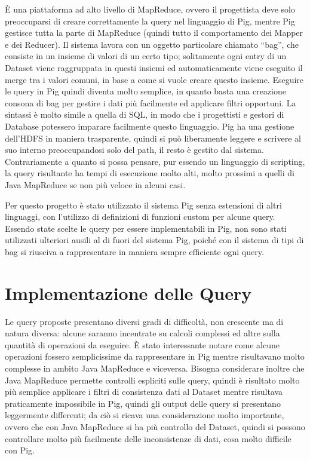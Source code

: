 \documentclass[11pt]{article} %
\begin{document}
 \`E una piattaforma ad alto livello di MapReduce, ovvero il progettista deve solo preoccuparsi di creare correttamente la query nel linguaggio di Pig, mentre Pig gestisce tutta la parte di MapReduce (quindi tutto il comportamento dei Mapper e dei Reducer). Il sistema lavora con un oggetto particolare chiamato ``bag'', che consiste in un insieme di valori di un certo tipo; solitamente ogni entry di un Dataset viene raggruppata in questi insiemi ed automaticamente viene eseguito il merge tra i valori comuni, in base a come si vuole creare questo insieme. Eseguire le query in Pig quindi diventa molto semplice, in quanto basta una creazione consona di bag per gestire i dati più facilmente ed applicare filtri opportuni.  La sintassi è molto simile a quella di SQL, in modo che i progettisti e gestori di Database potessero imparare facilmente questo linguaggio. Pig ha una gestione dell'HDFS in maniera trasparente, quindi si può liberamente leggere e scrivere al suo interno preoccupandosi solo del path, il resto è gestito dal sistema. Contrariamente a quanto si possa pensare, pur essendo un linguaggio di scripting, la query risultante ha tempi di esecuzione molto alti, molto prossimi a quelli di Java MapReduce se non più veloce in alcuni casi.
 
 Per questo progetto è stato utilizzato il sistema Pig senza estensioni di altri linguaggi, con l'utilizzo di definizioni di funzioni custom per alcune query. Essendo state scelte le query per essere implementabili in Pig, non sono stati utilizzati ulteriori ausili al di fuori del sistema Pig, poiché con il sistema di tipi di bag si riusciva a rappresentare in maniera sempre efficiente ogni query.

\section{Implementazione delle Query}

Le query proposte presentano diversi gradi di difficoltà, non crescente ma di natura diversa: alcune saranno incentrate su calcoli complessi ed altre sulla quantità di operazioni da eseguire. \`E stato interessante notare come alcune operazioni fossero semplicissime da rappresentare in Pig mentre risultavano molto complesse in ambito Java MapReduce e viceversa. Bisogna considerare inoltre che Java MapReduce permette controlli espliciti sulle query, quindi è risultato molto più semplice applicare i filtri di consistenza dati al Dataset mentre risultava praticamente impossibile in Pig, quindi gli output delle query si presentano leggermente differenti; da ciò si ricava una considerazione molto importante, ovvero che con Java MapReduce si ha più controllo del Dataset, quindi si possono controllare molto più facilmente delle inconsistenze di dati, cosa molto difficile con Pig.
\end{document}
